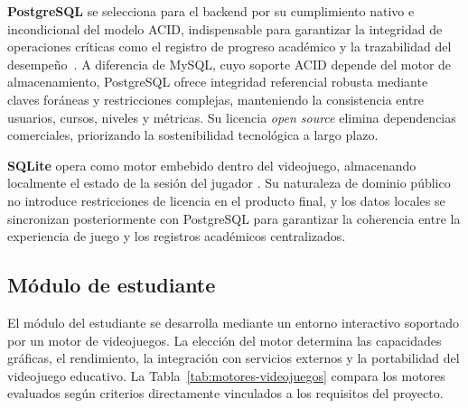 \textbf{PostgreSQL} se selecciona para el backend por su cumplimiento nativo e incondicional del modelo ACID, indispensable para garantizar la integridad de operaciones críticas como el registro de progreso académico y la trazabilidad del desempeño~\cite{postgresql}. A diferencia de MySQL, cuyo soporte ACID depende del motor de almacenamiento, PostgreSQL ofrece integridad referencial robusta mediante claves foráneas y restricciones complejas, manteniendo la consistencia entre usuarios, cursos, niveles y métricas. Su licencia \textit{open source} elimina dependencias comerciales, priorizando la sostenibilidad tecnológica a largo plazo.

\textbf{SQLite} opera como motor embebido dentro del videojuego, almacenando localmente el estado de la sesión del jugador \cite{sqlite}. Su naturaleza de dominio público no introduce restricciones de licencia en el producto final, y los datos locales se sincronizan posteriormente con PostgreSQL para garantizar la coherencia entre la experiencia de juego y los registros académicos centralizados.

\subsection{Módulo de estudiante}

El módulo del estudiante se desarrolla mediante un entorno interactivo soportado por un motor de videojuegos. La elección del motor determina las capacidades gráficas, el rendimiento, la integración con servicios externos y la portabilidad del videojuego educativo. La Tabla~\ref{tab:motores-videojuegos} compara los motores evaluados según criterios directamente vinculados a los requisitos del proyecto.

